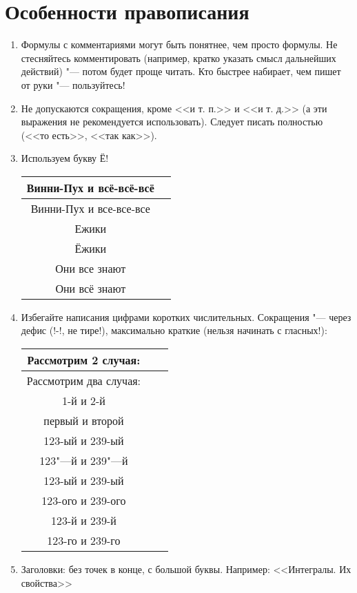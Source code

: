 \section{Особенности правописания}

\begin{enumerate}
\item
	Формулы с комментариями могут быть понятнее, чем просто формулы.
	Не стесняйтесь комментировать (например, кратко указать смысл
	дальнейших действий) "--- потом будет проще читать.
	Кто быстрее набирает, чем пишет от руки "--- пользуйтесь!

\item
	Не допускаются сокращения, кроме <<и т. п.>> и <<и т. д.>> (а эти выражения не рекомендуется использовать).
	Следует писать полностью (<<то есть>>, <<так как>>).

\item Используем букву Ё!
	\begin{center}\begin{tabular}{|c|c|}
		\hline Винни-Пух и всё-всё-всё \bad \\
		\hline Винни-Пух и все-все-все \ok \\
		\hline Ежики \bad \\
		\hline Ёжики \ok \\
		\hline Они все знают \ok \\
		\hline Они всё знают \ok \\
		\hline
	\end{tabular}\end{center}

\item
	Избегайте написания цифрами коротких числительных.
	Сокращения "--- через дефис (\tex!-!, не тире!), максимально краткие (нельзя начинать с гласных!):
	\begin{center}\begin{tabular}{|c|c|c|}
		\hline Рассмотрим 2 случая: \bad \\
		\hline Рассмотрим два случая: \ok \\
		\hline 1-й и 2-й \bad \\
		\hline первый и второй \ok\\
		\hline 123-ый и 239-ый \bad \\
		\hline 123"---й и 239"---й \bad \\
		\hline 123-ый и 239-ый \bad \\
		\hline 123-ого и 239-ого \bad \\
		\hline 123-й и 239-й \ok \\
		\hline 123-го и 239-го \ok \\
		\hline
	\end{tabular}\end{center}

\item
	Заголовки: без точек в конце, с большой буквы. Например: <<Интегралы. Их свойства>>
\end{enumerate}

